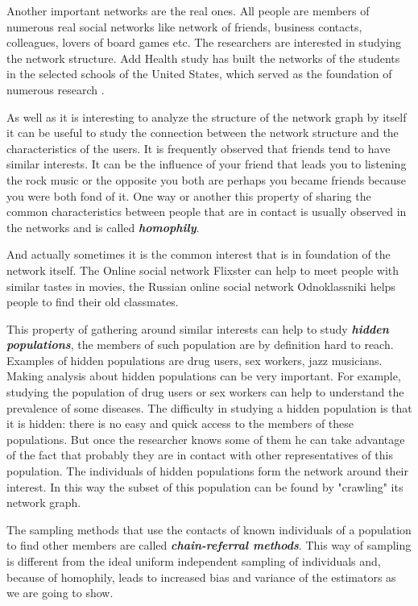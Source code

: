 \documentclass[12pt]{report}
\begin{document}
Another important networks are the real ones. All people are members of numerous real social networks like network of friends, business contacts, colleagues, lovers of board games etc. The researchers are interested in studying the network structure. Add Health study \cite{Addhealth} has built the networks of the students in the selected schools of the United States, which served as the foundation of numerous research \cite{jeon2015us}.

As well as it is interesting to analyze the structure of the network graph by itself it can be useful to study the connection between the network structure and the characteristics of the users. It is frequently observed that friends tend to have similar interests. It can be the influence of your friend that leads you to listening the rock music or the opposite you both are perhaps you became friends because you were both fond of it. One way or another this property of sharing the common characteristics between people that are in contact is usually observed in the networks and is called \textit{\textbf{homophily}}.

And actually sometimes it is the common interest that is in foundation of the network itself. The Online social network Flixster can help to meet people with similar tastes in movies, the Russian online social network Odnoklassniki helps people to find their old classmates. 

This property of gathering around similar interests can help to study \textit{\textbf{hidden populations}}, the members of such population are by definition hard to reach. Examples of hidden populations are drug users, sex workers, jazz musicians. Making analysis about hidden populations can be very important. For example, studying the population of drug users or sex workers can help to understand the prevalence of some diseases. The difficulty in studying a hidden population is that it is hidden: there is no easy and quick access to the members of these populations. But once the researcher knows some of them he can take advantage of the fact that probably they are in contact with other representatives of this population. The individuals of hidden populations form the network around their interest. In this way the subset of this population can be found by "crawling" its network graph.

The sampling methods that use the contacts of known individuals of a population to find other members are called \textit{\textbf{chain-referral methods}}.
This way of sampling is different from the ideal uniform independent sampling of individuals and, because of homophily, leads to increased bias and variance of the estimators as we are going to show. 
\end{document}
